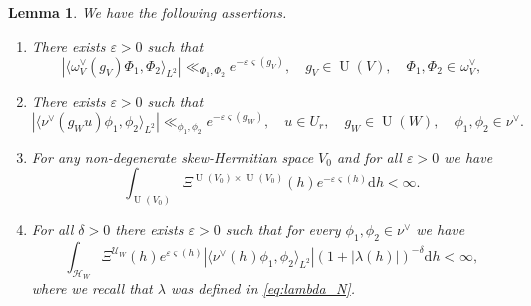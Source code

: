 \documentclass[letterpaper,11pt]{amsart}
\newcommand{\cH}{\mathcal{H}}
\newcommand{\cU}{\mathcal{U}}
\newcommand{\rd}{\mathrm{d}}
\newcommand{\<}{\negthickspace}
\newcommand{\valP}[1]{\left|#1\right|}
\DeclareMathOperator{\U}{U}
\theoremstyle{definition}
\theoremstyle{plain}
\newtheorem{lemma}[definition]{Lemma}
\theoremstyle{remark}
\numberwithin{equation}{section}
\begin{document}
\begin{lemma}
\label{lem:estimatesnew}
We have the following assertions.
\begin{enumerate}
    \item There exists $\varepsilon>0$ such that 
\begin{equation*}
   \valP{\langle\omega^\vee_V(g_V) \Phi_1, \Phi_2\rangle_{L^2}} \ll_{\Phi_1,\Phi_2} e^{- \varepsilon \varsigma(g_V)}, \quad g_V \in \U(V), \quad \Phi_1, \Phi_2 \in \omega^\vee_V, 
\end{equation*}
    \item There exists $\varepsilon>0$ such that 
\begin{equation*}
  \valP{ \langle \nu^\vee(g_Wu) \phi_1, \phi_2 \rangle_{L^2}} \ll_{\phi_1,\phi_2} e^{- \varepsilon \varsigma(g_W)}, \quad u \in U_r, \quad g_W \in \U(W), \quad \phi_1, \phi_2 \in \nu^\vee.
\end{equation*}
\item For any non-degenerate skew-Hermitian space $V_0$ and for all $\varepsilon >0$ we have 
\begin{equation*}
    \int_{\U(V_0)} \Xi^{\U(V_0)\times \U(V_0)}(h) e^{-\varepsilon \varsigma(h)} \rd h < \infty.
\end{equation*}
\item For all $\delta>0$ there exists $\varepsilon >0$ such that for every $\phi_1, \phi_2 \in \nu^\vee$ we have
\begin{equation*}
    \int_{\cH_W} \Xi^{\cU_W}(h) e^{\varepsilon \varsigma(h)} \valP{ \langle \nu^\vee(h) \phi_1, \phi_2 \rangle_{L^2}} (1+\valP{\lambda(h)})^{-\delta} \rd h < \infty,
\end{equation*}
where we recall that $\lambda$ was defined in \eqref{eq:lambda_N}.
\end{enumerate}
\end{lemma}
\end{document}
